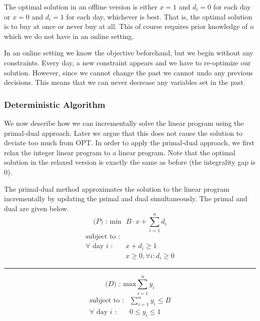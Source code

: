 The optimal solution in an offline version is either $x=1$ and $d_i = 0$ for each day or $x=0$ and $d_i = 1$ for each day, whichever is best.
That is, the optimal solution is to buy at once or never buy at all.
This of course requires prior knowledge of $n$ which we do not have in an online setting.

In an online setting we know the objective beforehand, but we begin without any constraints.
Every day, a new constraint appears and we have to re-optimize our solution.
However, since we cannot change the past we cannot undo any previous decisions.
This means that we can never decrease any variables set in the past.

\subsubsection{Deterministic Algorithm}

We now describe how we can incrementally solve the linear program using the primal-dual approach.
Later we argue that this does not cause the solution to deviate too much from OPT.
In order to apply the primal-dual approach, we first relax the integer linear program to a linear program. Note that the optimal solution in the relaxed version is exactly the same as before (the integrality gap is $0$).

The primal-dual method approximates the solution to the linear program incrementally by updating the primal and dual simultaneously.
The primal and dual are given below.
\[
\textrm{($P$) : min} \textrm{ } B\cdot x + \sum^n_{i=1} d_i
\]
\[
	\begin{array}{lr}
	\textrm{subject to :} & \\
	\textrm{$\forall$ day $i$} \textrm{ :} & x + d_i  \ge 1  \\
			    & x     \geq 0, \forall i : d_i \ge 0

	\end{array}
\]

\vspace{0.1cm}
\hrule
\vspace{0.1cm}

\[
\textrm{($D$) : max} \sum^n_{i=1} y_i
\]
\[
	\begin{array}{lr}
	\textrm{subject to :} & \sum^n_{i=1} y_i \le B \\
		\textrm{$\forall$ day $i$} \textrm{ :} & 0 \le y_i  \le 1 \\
	\end{array}
\]


